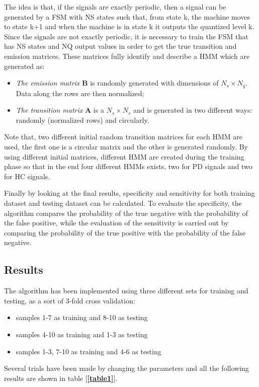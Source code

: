 \documentclass[a4paper,12pt,oneside,titlepage]{article}
\begin{document}
	The idea is that, if the signals are exactly periodic, then a signal can be generated by a FSM with NS states such that, from state k, the machine moves to state k+1 and when the machine is in state k it outputs the quantized level k. Since the signals are not exactly periodic, it is necessary to train the FSM that has NS states and NQ output values in order to get the true transition and emission matrices. These matrices fully identify and describe a HMM which are generated as: 
	\begin{itemize}
	\item \textit{The emission matrix} \textbf{B} is randomly generated with dimensions of $N_{s}\times N_{q}$. Data along the rows are then normalized; 
	\item \textit{The transition matrix} \textbf{A} is a $N_{s}\times N_{s}$ and is generated in two different ways: randomly (normalized rows) and circularly. 
	\end{itemize}

	Note that, two different initial random transition matrices for each HMM are used, the first one is a circular matrix and the other is generated randomly. By using different initial matrices, different HMM are created during the training phase so that in the end four different HMMs exists, two for PD signals and two for HC signals.
	
	Finally by looking at the final results, specificity and sensitivity for both training dataset and testing dataset can be calculated. To evaluate the specificity, the algorithm compares the probability of the true negative with the probability of the false positive, while the evaluation of the sensitivity is carried out by comparing the probability of the true positive with the probability of the false negative.	
	
	\subsection{Results}
	The algorithm has been implemented using three different sets for training and testing, as a sort of 3-fold cross validation:
	\begin{itemize}
		\item samples 1-7 as training and 8-10 as testing
		\item samples 4-10 as training and 1-3 as testing
		\item samples 1-3, 7-10 as training and 4-6 as testing
	\end{itemize}
	Several trials have been made by changing the parameters and all the following results are shown in table [{\textbf{\ref{table1}}}].
	
\end{document}
